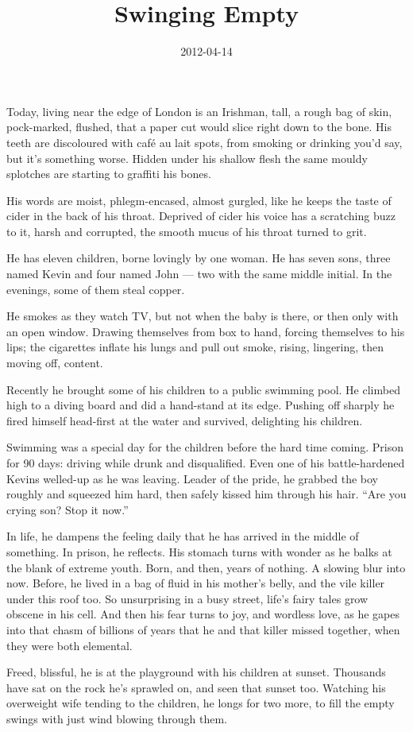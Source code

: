 \documentclass[11pt]{article}
\title{Swinging Empty}
\date{2012-04-14}
\begin{document}
Today, living near the edge of London is an Irishman, tall, a rough bag of skin, pock-marked, flushed, that a paper cut would slice right down to the bone. His teeth are discoloured with caf\'e au lait spots, from smoking or drinking you'd say, but it's something worse. Hidden under his shallow flesh the same mouldy splotches are starting to graffiti his bones.

His words are moist, phlegm-encased, almost gurgled, like he keeps the taste of cider in the back of his throat. Deprived of cider his voice has a scratching buzz to it, harsh and corrupted, the smooth mucus of his throat turned to grit.

He has eleven children, borne lovingly by one woman. He has seven sons, three named Kevin and four named John --- two with the same middle initial. In the evenings, some of them steal copper.

He smokes as they watch TV, but not when the baby is there, or then only with an open window. Drawing themselves from box to hand, forcing themselves to his lips; the cigarettes inflate his lungs and pull out smoke, rising, lingering, then moving off, content.

Recently he brought some of his children to a public swimming pool. He climbed high to a diving board and did a hand-stand at its edge. Pushing off sharply he fired himself head-first at the water and survived, delighting his children.

Swimming was a special day for the children before the hard time coming. Prison for 90 days: driving while drunk and disqualified. Even one of his battle-hardened Kevins welled-up as he was leaving. Leader of the pride, he grabbed the boy roughly and squeezed him hard, then safely kissed him through his hair. ``Are you crying son? Stop it now.''

In life, he dampens the feeling daily that he has arrived in the middle of something. In prison, he reflects. His stomach turns with wonder as he balks at the blank of extreme youth. Born, and then, years of nothing. A slowing blur into now. Before, he lived in a bag of fluid in his mother's belly, and the vile killer under this roof too. So unsurprising in a busy street, life's fairy tales grow obscene in his cell. And then his fear turns to joy, and wordless love, as he gapes into that chasm of billions of years that he and that killer missed together, when they were both elemental.

Freed, blissful, he is at the playground with his children at sunset. Thousands have sat on the rock he's sprawled on, and seen that sunset too. Watching his overweight wife tending to the children, he longs for two more, to fill the empty swings with just wind blowing through them.
\end{document}
